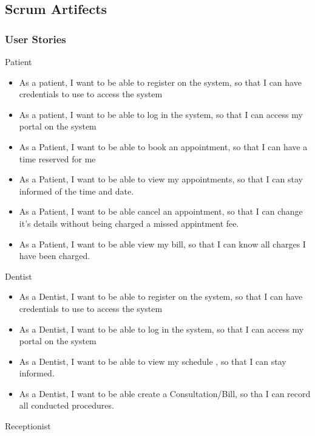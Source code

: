 \documentclass[11 pt]{article}
\begin{document}
  \subsection{Scrum Artifects}
  \subsubsection{User Stories}
  Patient
  \begin{itemize}
  \item
  As a patient, I want to be able to register on the system, so that I can have credentials to use to access the system
  \item
  As a patient, I want to be able to log in the system, so that I can access my portal on the system
  \item
  As a Patient, I want to be able to book an appointment, so that I can 				have a time reserved for me
  \item
  As a Patient, I want to be able to view my appointments, so that I can stay informed of the time and date.
  \item
  As a Patient, I want to be able cancel an appointment, so that I can change it's details without being charged a missed appintment fee.
  \item
  As a Patient, I want to be able view my bill, so that I can know all charges I have been charged.
  \end{itemize}
   Dentist
   \begin{itemize}
    \item
  As a Dentist, I want to be able to register on the system, so that I can have credentials to use to access the system
  \item
  As a Dentist, I want to be able to log in the system, so that I can access my portal on the system
  \item
  As a Dentist, I want to be able to view my schedule , so that I can stay informed.
  \item
  As a Dentist, I want to be able create a Consultation/Bill, so tha I can record all conducted procedures.
   \end{itemize}
   
   Receptionist
   
\end{document}
